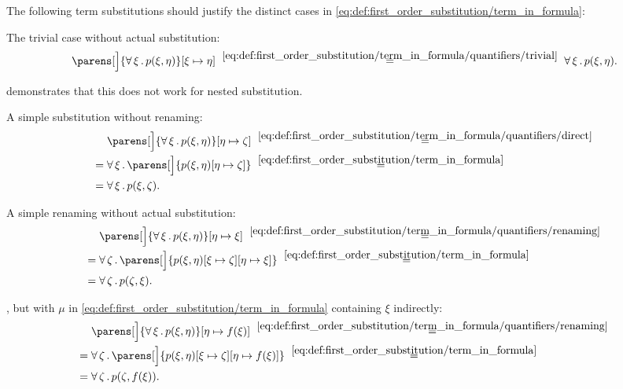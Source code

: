 \begin{example}\label{ex:first_order_substitution}
  The following term substitutions should justify the distinct cases in \eqref{eq:def:first_order_substitution/term_in_formula}:
  \begin{thmenum}
     The trivial case without actual substitution:
    \begin{equation*}
      \parens[\Big]{\qforall \xi p(\xi, \eta)}[\xi \mapsto \eta]
      \reloset {\eqref{eq:def:first_order_substitution/term_in_formula/quantifiers/trivial}} =
      \qforall \xi p(\xi, \eta).
    \end{equation*}

     demonstrates that this does not work for nested substitution.

     A simple substitution without renaming:
    \begin{align*}
      &\phantom{{}={}}
      \parens[\Big]{\qforall \xi p(\xi, \eta)}[\eta \mapsto \zeta]
      \reloset {\eqref{eq:def:first_order_substitution/term_in_formula/quantifiers/direct}} = \\ &=
      \qforall \xi \parens[\Big]{p(\xi, \eta)[\eta \mapsto \zeta]}
      \reloset {\eqref{eq:def:first_order_substitution/term_in_formula}} = \\ &=
      \qforall \xi p(\xi, \zeta).
    \end{align*}

     A simple renaming without actual substitution:
    \begin{align*}
      &\phantom{{}={}}
      \parens[\Big]{\qforall \xi p(\xi, \eta)}[\eta \mapsto \xi]
      \reloset {\eqref{eq:def:first_order_substitution/term_in_formula/quantifiers/renaming}} = \\ &=
      \qforall \zeta \parens[\Big]{p(\xi, \eta)[\xi \mapsto \zeta][\eta \mapsto \xi]}
      \reloset {\eqref{eq:def:first_order_substitution/term_in_formula}} = \\ &=
      \qforall \zeta p(\zeta, \xi).
    \end{align*}

     , but with \( \mu \) in \eqref{eq:def:first_order_substitution/term_in_formula} containing \( \xi \) indirectly:
    \begin{align*}
      &\phantom{{}={}}
      \parens[\Big]{\qforall \xi p(\xi, \eta)}[\eta \mapsto f(\xi)]
      \reloset {\eqref{eq:def:first_order_substitution/term_in_formula/quantifiers/renaming}} = \\ &=
      \qforall \zeta \parens[\Big]{p(\xi, \eta)[\xi \mapsto \zeta][\eta \mapsto f(\xi)]}
      \reloset {\eqref{eq:def:first_order_substitution/term_in_formula}} = \\ &=
      \qforall \zeta p(\zeta, f(\xi)).
    \end{align*}


\end{thmenum}
\end{example}
